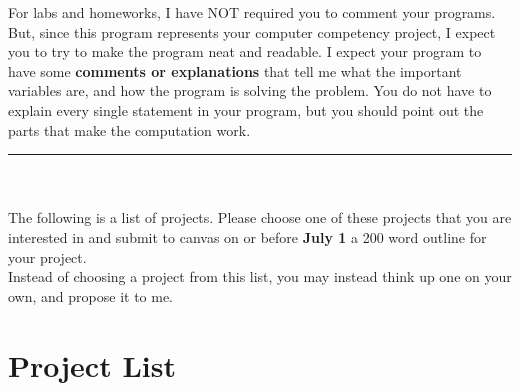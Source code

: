 \documentclass{article}
\begin{document}
\noindent
For labs and homeworks, I have NOT required you to comment your programs. But, since this program represents your computer competency project, I expect you to try to make the program neat and readable. I expect your program to have some \textbf{comments or explanations} that tell me what the important variables are, and how the program is solving the problem. You do not have to explain every single statement in your program, but you should point out the parts that make the computation work.\\

\par\noindent\rule{\textwidth}{0.4pt}\\
\\
\noindent
The following is a list of projects. 
Please choose one of these projects that you are interested in and submit to canvas on or before \textbf{July 1} a 200 word outline for your project.\\
Instead of choosing a project from this list, you may instead think up one on your own, and propose it to me.

\section*{Project List}
\end{document}
